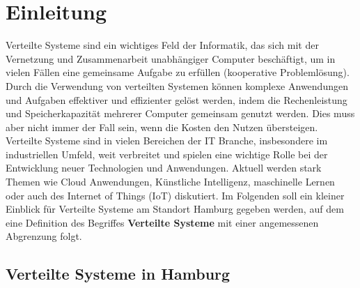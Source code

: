\documentclass[../vs-script-first-v01.tex]{subfiles}
\begin{document}
\section{Einleitung}

Verteilte Systeme sind ein wichtiges Feld der Informatik, das sich mit der Vernetzung und Zusammenarbeit unabhängiger Computer beschäftigt, um in vielen Fällen eine gemeinsame Aufgabe zu erfüllen (kooperative Problemlösung). Durch die Verwendung von verteilten Systemen können komplexe Anwendungen und Aufgaben effektiver und effizienter gelöst werden, indem die Rechenleistung und Speicherkapazität mehrerer Computer gemeinsam genutzt werden. Dies muss aber nicht immer der Fall sein, wenn die Kosten den Nutzen übersteigen. Verteilte Systeme sind in vielen Bereichen der IT Branche, insbesondere im industriellen Umfeld, weit verbreitet und spielen eine wichtige Rolle bei der Entwicklung neuer Technologien und Anwendungen. Aktuell werden stark Themen wie Cloud Anwendungen, Künstliche Intelligenz, maschinelle Lernen oder auch des Internet of Things (IoT) diskutiert. Im Folgenden soll ein kleiner Einblick für Verteilte Systeme am Standort Hamburg gegeben werden, auf dem eine Definition des Begriffes \textbf{Verteilte Systeme}  mit einer angemessenen Abgrenzung folgt.

\subsection{Verteilte Systeme in Hamburg}
\end{document}
